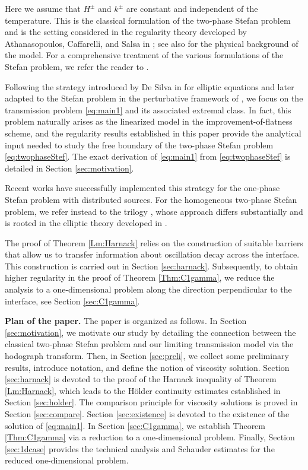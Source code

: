 \documentclass[12pt]{article}
\numberwithin{Theorem}{section}
\theoremstyle{definition}
\theoremstyle{remark}
\numberwithin{equation}{section}
\begin{document}
Here we assume that $H^\pm$ and $k^\pm$ are constant and independent of the temperature. This is the classical formulation of the two-phase Stefan problem and is the setting considered in the regularity theory developed by Athanasopoulos, Caffarelli, and Salsa in \cite{ACS,ACS2,ACS3}; see also \cite[Chapter XI]{carslaw1959conduction} for the physical background of the model.
For a comprehensive treatment of the various formulations of the Stefan problem, we refer the reader to \cite{vis,Friedman,Friedmanerr}.

Following the strategy introduced by De Silva in \cite{DeSilva2011} for elliptic equations and later adapted to the Stefan problem in the perturbative framework of \cite{DFS23}, we focus on the transmission problem \eqref{eq:main1} and its associated extremal class. In fact, this problem naturally arises as the linearized model in the improvement-of-flatness scheme, and the regularity results established in this paper provide the analytical input needed to study the free boundary of the two-phase Stefan problem \eqref{eq:twophaseStef}. The exact derivation of \eqref{eq:main1} from \eqref{eq:twophaseStef} is detailed in Section \ref{sec:motivation}.



Recent works \cite{ferrari2026free,ferrari2025geometry} have successfully implemented this strategy for the one-phase Stefan problem with distributed sources. For the homogeneous two-phase Stefan problem, we refer instead to the trilogy \cite{ACS,ACS2,ACS3}, whose approach differs substantially and is rooted in the elliptic theory developed in \cite{CS}.

The proof of Theorem \ref{Lm:Harnack} relies on the construction of suitable barriers that allow us to transfer  information about oscillation decay across the interface. This construction is carried out in Section \ref{sec:harnack}.
Subsequently, to obtain higher regularity in the proof of Theorem \ref{Thm:C1gamma}, we reduce the analysis to a one-dimensional problem along the direction perpendicular to the interface, see Section \ref{sec:C1gamma}.





\smallskip
\noindent\textbf{Plan of the paper.} The paper is organized as follows.  In Section \ref{sec:motivation}, we motivate our study by detailing the connection between the classical two-phase Stefan problem and our limiting transmission model via the hodograph transform.
Then, in Section \ref{sec:preli}, we collect some preliminary results, introduce notation, and define the notion of viscosity solution. Section \ref{sec:harnack} is devoted to the proof of the Harnack inequality of Theorem \ref{Lm:Harnack}, which leads to the H\"older continuity estimates established in Section \ref{sec:holder}. The comparison principle for viscosity solutions is proved in Section \ref{sec:compare}. Section \ref{sec:existence} is devoted to the existence of the solution of \eqref{eq:main1}. In Section \ref{sec:C1gamma}, we establish Theorem \ref{Thm:C1gamma} via a reduction to a one-dimensional problem. Finally, Section \ref{sec:1dcase} provides the technical analysis and Schauder estimates for the reduced one-dimensional problem.
\end{document}
